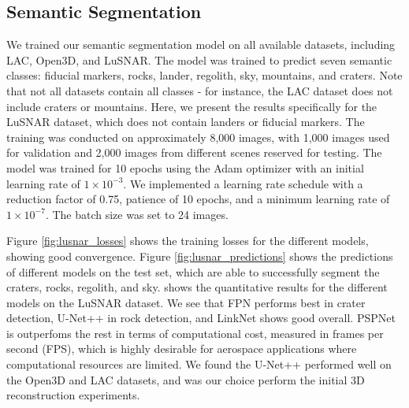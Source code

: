 
\subsection{Semantic Segmentation}
We trained our semantic segmentation model on all available datasets, including LAC, Open3D, and LuSNAR. The model was trained to predict seven semantic classes: fiducial markers, rocks, lander, regolith, sky, mountains, and craters. Note that not all datasets contain all classes - for instance, the LAC dataset does not include craters or mountains. Here, we present the results specifically for the LuSNAR dataset, which does not contain landers or fiducial markers. The training was conducted on approximately 8,000 images, with 1,000 images used for validation and 2,000 images from different scenes reserved for testing. The model was trained for 10 epochs using the Adam optimizer with an initial learning rate of $1\times10^{-3}$. We implemented a learning rate schedule with a reduction factor of 0.75, patience of 10 epochs, and a minimum learning rate of $1\times10^{-7}$. The batch size was set to 24 images.

Figure \ref{fig:lusnar_losses} shows the training losses for the different models, showing good convergence. Figure \ref{fig:lusnar_predictions} shows the predictions of different models on the test set, which are able to successfully segment the craters, rocks, regolith, and sky.  shows the quantitative results for the different models on the LuSNAR dataset. We see that FPN performs best in crater detection, U-Net++ in rock detection, and LinkNet shows good overall. PSPNet is outperfoms the rest in terms of computational cost, measured in frames per second (FPS), which is highly desirable for aerospace applications where computational resources are limited. We found the U-Net++ performed well on the Open3D and LAC datasets, and was our choice perform the initial 3D reconstruction experiments.

